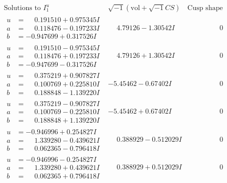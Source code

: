 \documentclass[1p]{elsarticle_modified}
\theoremstyle{definition}
\newcommand{\I}{\sqrt{-1}}
\begin{document}
$$\begin{array}{c|c|c}  
\text{Solutions to }I^u_{1}& \I (\text{vol} + \sqrt{-1}CS) & \text{Cusp shape}\\
 \hline 
\begin{aligned}
u &= \phantom{-}0.191510 + 0.975345 I \\
a &= \phantom{-}0.118476 - 0.197233 I \\
b &= -0.947699 + 0.317526 I\end{aligned}
 & \phantom{-}4.79126 - 1.30542 I & \phantom{-0.000000 } 0 \\ \hline\begin{aligned}
u &= \phantom{-}0.191510 - 0.975345 I \\
a &= \phantom{-}0.118476 + 0.197233 I \\
b &= -0.947699 - 0.317526 I\end{aligned}
 & \phantom{-}4.79126 + 1.30542 I & \phantom{-0.000000 } 0 \\ \hline\begin{aligned}
u &= \phantom{-}0.375219 + 0.907827 I \\
a &= \phantom{-}0.100769 + 0.225810 I \\
b &= \phantom{-}0.188848 - 1.139220 I\end{aligned}
 & -5.45462 - 0.67402 I & \phantom{-0.000000 } 0 \\ \hline\begin{aligned}
u &= \phantom{-}0.375219 - 0.907827 I \\
a &= \phantom{-}0.100769 - 0.225810 I \\
b &= \phantom{-}0.188848 + 1.139220 I\end{aligned}
 & -5.45462 + 0.67402 I & \phantom{-0.000000 } 0 \\ \hline\begin{aligned}
u &= -0.946996 + 0.254827 I \\
a &= \phantom{-}1.339280 - 0.439621 I \\
b &= \phantom{-}0.062365 - 0.796418 I\end{aligned}
 & \phantom{-}0.388929 - 0.512029 I & \phantom{-0.000000 } 0 \\ \hline\begin{aligned}
u &= -0.946996 - 0.254827 I \\
a &= \phantom{-}1.339280 + 0.439621 I \\
b &= \phantom{-}0.062365 + 0.796418 I\end{aligned}
 & \phantom{-}0.388929 + 0.512029 I & \phantom{-0.000000 } 0 \\ \hline\begin{aligned}

\end{aligned}
\end{array}$$
\end{document}

